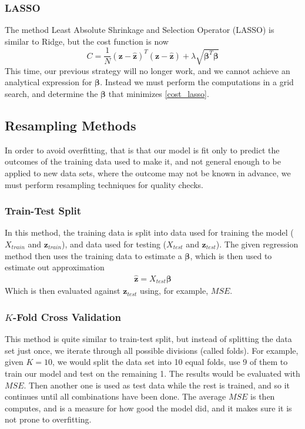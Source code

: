 \documentclass[reprint,english,notitlepage]{revtex4-1}  %
\newcommand{\vect}[1]{\boldsymbol{#1}}
\begin{document}
\subsubsection{LASSO}
The method Least Absolute Shrinkage and Selection Operator (LASSO) is similar to Ridge, but the cost function is now
\begin{equation} \label{cost_lasso}
	C = \frac{1}{N}\left(\vect{z} - \hat{\vect{z}} \right)^T \left(\vect{z} - \hat{\vect{z}} \right) + \lambda \sqrt{\vect{\beta}^T\vect{\beta}}
\end{equation}
This time, our previous strategy will no longer work, and we cannot achieve an analytical expression for $\vect{\beta}$. Instead we must perform the computations in a grid search, and determine the $\vect{\beta}$ that minimizes \ref{cost_lasso}.

\subsection{Resampling Methods}
In order to avoid overfitting, that is that our model is fit only to predict the outcomes of the training data used to make it, and not general enough to be applied to new data sets, where the outcome may not be known in advance, we must perform resampling techniques for quality checks.
\subsubsection{Train-Test Split}
In this method, the training data is split into data used for training the model ($X_{train}$ and $\vect{z}_{train}$), and data used for testing ($X_{test}$ and $\vect{z}_{test}$). The given regression method then uses the training data to estimate a $\vect{\beta}$, which is then used to estimate out approximation
\begin{align*}
	\hat{\vect{z}} = X_{test}\vect{\beta}
\end{align*}
Which is then evaluated against $\vect{z}_{test}$ using, for example, $MSE$.

\subsubsection{$K$-Fold Cross Validation}
This method is quite similar to train-test split, but instead of splitting the data set just once, we iterate through all possible divisions (called folds). For example, given $K = 10$, we would split the data set into 10 equal folds, use 9 of them to train our model and test on the remaining 1. The results would be evaluated with $MSE$. Then another one is used as test data while the rest is trained, and so it continues until all combinations have been done. The average $MSE$ is then computes, and is a measure for how good the model did, and it makes sure it is not prone to overfitting.
\end{document}
